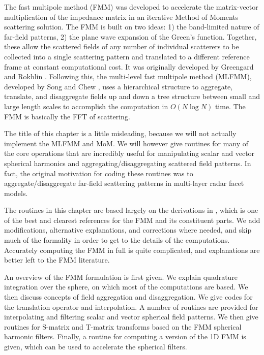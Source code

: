 

The fast multipole method (FMM) was developed to accelerate the matrix-vector multiplication of the impedance matrix in an iterative Method of Moments scattering solution. The FMM is built on two ideas: 1) the band-limited nature of far-field patterns, 2) the plane wave expansion of the Green's function. Together, these allow the scattered fields of any number of individual scatterers to be collected into a single scattering pattern and translated to a different reference frame at constant computational cost. It was originally developed by Greengard and Rokhlin \cite{greengard1997fast}. Following this, the multi-level fast multipole method (MLFMM), developed by Song and Chew \cite{song1995multilevel}, uses a hierarchical structure to aggregate, translate, and disaggregate fields up and down a tree structure between small and large length scales to accomplish the computation in $O(N\log N)$ time. The FMM is basically the FFT of scattering.   

The title of this chapter is a little misleading, because we will not actually implement the MLFMM and MoM. We will however give routines for many of the core operations that are incredibly useful for manipulating scalar and vector spherical harmonics and aggregating/disaggregating scattered field patterns. In fact, the original motivation for coding these routines was to aggregate/disaggregate far-field scattering patterns in multi-layer radar facet models. 

The routines in this chapter are based largely on the derivations in \cite{yucel2008helmholtz}, which is one of the best and clearest references for the FMM and its constituent parts. We add modifications, alternative explanations, and corrections where needed, and skip much of the formality in order to get to the details of the computations. Accurately computing the FMM in full is quite complicated, and explanations are better left to the FMM literature. 

An overview of the FMM formulation is first given. We explain quadrature integration over the sphere, on which most of the computations are based. We then discuss concepts of field aggregation and disaggregation. We give codes for the translation operator and interpolation. A number of routines are provided for interpolating and filtering scalar and vector spherical field patterns. We then give routines for S-matrix and T-matrix transforms based on the FMM spherical harmonic filters. Finally, a routine for computing a version of the 1D FMM is given, which can be used to accelerate the spherical filters.





